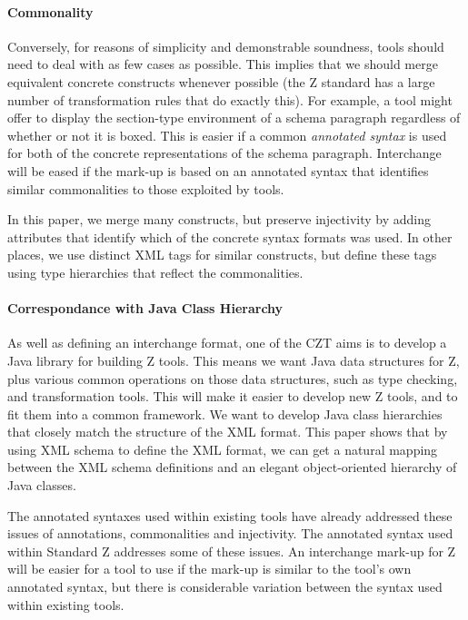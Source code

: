 \documentclass{llncs}  %
\begin{document}
\paragraph{Commonality}
Conversely, for reasons of simplicity and demonstrable soundness, 
tools should need to deal with as few cases as possible.  This implies
that we should merge equivalent concrete constructs whenever possible
(the Z standard has a large number of transformation rules that do
exactly this).
For example, a tool might offer to display the section-type environment
of a schema paragraph regardless of whether or not it is boxed.
This is easier if a common \textit{annotated syntax} is used
for both of the concrete representations of the schema paragraph.
Interchange will be eased if the mark-up is based on an annotated syntax
that identifies similar commonalities to those exploited by tools.

In this paper, we merge many constructs, but preserve injectivity
by adding attributes that identify which of the concrete syntax formats
was used.  In other places, we use distinct XML tags for similar
constructs, but define these tags using type hierarchies that reflect 
the commonalities. 

\paragraph{Correspondance with Java Class Hierarchy}
As well as defining an interchange format, one of the CZT 
aims is to develop a Java library for building Z tools.  
This means we want Java data structures for Z, plus various
common operations on those data structures, such as type checking,
and transformation tools.  This will make it easier to develop new
Z tools, and to fit them into a common framework.
We want to develop Java class hierarchies
that closely match the structure of the XML format.  
This paper shows that by using XML schema to define the XML format,
we can get a natural mapping between the XML schema definitions and
an elegant object-oriented hierarchy of Java classes.

\vspace{1.5ex}

The annotated syntaxes used within existing tools have already
addressed these issues of annotations, commonalities and injectivity.
The annotated syntax used within Standard Z addresses some of these issues.
An interchange mark-up for Z will be easier for a tool to use
if the mark-up is similar to the tool's own annotated syntax,
but there is considerable variation between the syntax used within existing
tools. 
\end{document}
